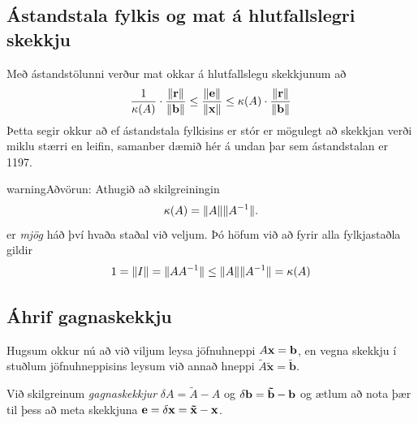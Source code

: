 \documentclass[letterpaper,10pt,icelandic]{sphinxmanual}
\begin{document}
\subsection{Ástandstala fylkis og mat á hlutfallslegri skekkju}
\label{kafli08:astandstala-fylkis-og-mat-a-hlutfallslegri-skekkju}
Með ástandstölunni verður mat okkar á hlutfallslegu skekkjunum að
\begin{gather}
\begin{split}\dfrac 1{\kappa(A)}\cdot \dfrac{ \|\mbox{${\bf r}$}\|}{\|\mbox{${\bf b}$}\|}
\leq \dfrac{\|\mbox{${\bf e}$}\|}{\|\mbox{${\bf x}$}\|} \leq
\kappa(A)\cdot \dfrac{\|\mbox{${\bf r}$}\|}{\|\mbox{${\bf b}$}\|}\end{split}\notag
\end{gather}
Þetta segir okkur að ef ástandstala fylkisins er stór er mögulegt að
skekkjan verði miklu stærri en leifin, samanber dæmið hér á undan
þar sem ástandstalan er 1197.

\begin{notice}{warning}{Aðvörun:}
Athugið að skilgreiningin
\begin{gather}
\begin{split}\kappa(A)=\|A\|\|A^{-1}\|.\end{split}\notag
\end{gather}
er \emph{mjög} háð því hvaða staðal við veljum. Þó höfum við að fyrir
alla fylkjastaðla gildir
\begin{gather}
\begin{split}1=\|I\|=\|AA^{-1}\|\leq \|A\|\|A^{-1}\|=\kappa(A)\end{split}\notag
\end{gather}\end{notice}


\subsection{Áhrif gagnaskekkju}
\label{kafli08:index-15}\label{kafli08:ahrif-gagnaskekkju}
Hugsum okkur nú að við viljum leysa jöfnuhneppi
\(A\mbox{${\bf x}$}=\mbox{${\bf b}$}\), en vegna skekkju í stuðlum
jöfnuhneppisins leysum við annað hneppi
\(\tilde A\mathbf {\tilde x}=\mathbf{\tilde b}\).

Við skilgreinum \emph{gagnaskekkjur} \(\delta A=\tilde A-A\) og
\(\delta\mbox{${\bf b}$}=\mathbf{\tilde b}-\mbox{${\bf b}$}\) og
ætlum að nota þær til þess að meta skekkjuna
\(\mbox{${\bf e}$}=\delta\mbox{${\bf x}$}=\mathbf{\tilde x}-\mbox{${\bf x}$}\).
\end{document}
